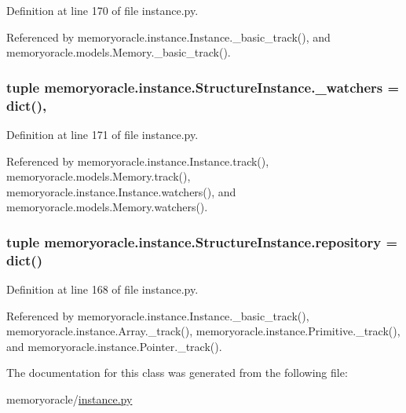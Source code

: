 Definition at line 170 of file instance.\+py.



Referenced by memoryoracle.\+instance.\+Instance.\+\_\+basic\+\_\+track(), and memoryoracle.\+models.\+Memory.\+\_\+basic\+\_\+track().

\hypertarget{classmemoryoracle_1_1instance_1_1StructureInstance_a3aa33ca437060ed8c6db969c9cd2bcc6}{}
\subsubsection[{\+\_\+watchers}]{\setlength{\rightskip}{0pt plus 5cm}tuple memoryoracle.\+instance.\+Structure\+Instance.\+\_\+watchers = dict()\hspace{0.3cm}{\ttfamily [static]}, {\ttfamily [private]}}\label{classmemoryoracle_1_1instance_1_1StructureInstance_a3aa33ca437060ed8c6db969c9cd2bcc6}


Definition at line 171 of file instance.\+py.



Referenced by memoryoracle.\+instance.\+Instance.\+track(), memoryoracle.\+models.\+Memory.\+track(), memoryoracle.\+instance.\+Instance.\+watchers(), and memoryoracle.\+models.\+Memory.\+watchers().

\hypertarget{classmemoryoracle_1_1instance_1_1StructureInstance_ade530272937d7c23c79635a5741bfc23}{}
\subsubsection[{repository}]{\setlength{\rightskip}{0pt plus 5cm}tuple memoryoracle.\+instance.\+Structure\+Instance.\+repository = dict()\hspace{0.3cm}{\ttfamily [static]}}\label{classmemoryoracle_1_1instance_1_1StructureInstance_ade530272937d7c23c79635a5741bfc23}


Definition at line 168 of file instance.\+py.



Referenced by memoryoracle.\+instance.\+Instance.\+\_\+basic\+\_\+track(), memoryoracle.\+instance.\+Array.\+\_\+track(), memoryoracle.\+instance.\+Primitive.\+\_\+track(), and memoryoracle.\+instance.\+Pointer.\+\_\+track().



The documentation for this class was generated from the following file\+:\begin{DoxyCompactItemize}
\item 
memoryoracle/\hyperlink{instance_8py}{instance.\+py}\end{DoxyCompactItemize}
